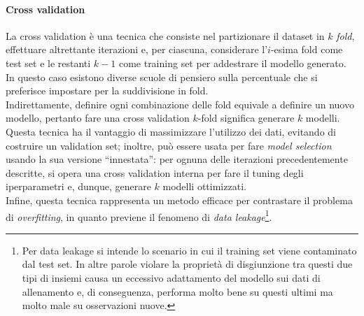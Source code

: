 \documentclass[12pt]{report}
\theoremstyle{definition}
\begin{document}
\paragraph{Cross validation} 
La cross validation è una tecnica che consiste nel partizionare il dataset in $k$ \textit{fold}, effettuare altrettante iterazioni e, per ciascuna, considerare l'$i$-esima fold come test set e le restanti $k-1$ come training set per addestrare il modello generato.
\\
In questo caso esistono diverse scuole di pensiero sulla percentuale che si preferisce impostare per la suddivisione in fold.
\\
Indirettamente, definire ogni combinazione delle fold equivale a definire un nuovo modello, pertanto fare una cross validation $k$-fold significa generare $k$ modelli.
\\
Questa tecnica ha il vantaggio di massimizzare l'utilizzo dei dati, evitando di costruire un validation set; inoltre, può essere usata per fare \textit{model selection} usando la sua versione ``innestata'': per ognuna delle iterazioni precedentemente descritte, si opera una cross validation interna per fare il tuning degli iperparametri e, dunque, generare $k$ modelli ottimizzati.
\\
Infine, questa tecnica rappresenta un metodo efficace per contrastare il problema di \textit{overfitting}, in quanto previene il fenomeno di \textit{data leakage}\footnote{Per data leakage si intende lo scenario in cui il training set viene contaminato dal test set. In altre parole violare la proprietà di disgiunzione tra questi due tipi di insiemi causa un eccessivo adattamento del modello sui dati di allenamento e, di conseguenza, performa molto bene su questi ultimi ma molto male su osservazioni nuove.}.
\end{document}
